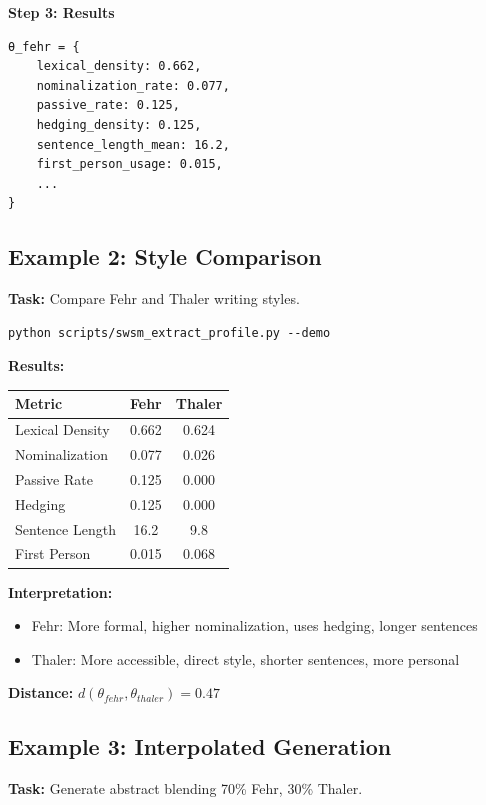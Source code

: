 \textbf{Step 3: Results}
\begin{verbatim}
θ_fehr = {
    lexical_density: 0.662,
    nominalization_rate: 0.077,
    passive_rate: 0.125,
    hedging_density: 0.125,
    sentence_length_mean: 16.2,
    first_person_usage: 0.015,
    ...
}
\end{verbatim}

\subsection{Example 2: Style Comparison}
\label{sec:sw-ex2}

\textbf{Task:} Compare Fehr and Thaler writing styles.

\begin{verbatim}
python scripts/swsm_extract_profile.py --demo
\end{verbatim}

\textbf{Results:}
\begin{center}
\begin{tabular}{lcc}
\toprule
Metric & Fehr & Thaler \\
\midrule
Lexical Density & 0.662 & 0.624 \\
Nominalization & 0.077 & 0.026 \\
Passive Rate & 0.125 & 0.000 \\
Hedging & 0.125 & 0.000 \\
Sentence Length & 16.2 & 9.8 \\
First Person & 0.015 & 0.068 \\
\bottomrule
\end{tabular}
\end{center}

\textbf{Interpretation:}
\begin{itemize}
    \item Fehr: More formal, higher nominalization, uses hedging, longer sentences
    \item Thaler: More accessible, direct style, shorter sentences, more personal
\end{itemize}

\textbf{Distance:} $d(\theta_{fehr}, \theta_{thaler}) = 0.47$

\subsection{Example 3: Interpolated Generation}
\label{sec:sw-ex3}

\textbf{Task:} Generate abstract blending 70\% Fehr, 30\% Thaler.

